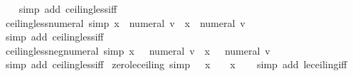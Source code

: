 \begin{isabellebody}
%
\isadelimproof
\ \ %
\endisadelimproof
%
\isatagproof
{}\isamarkupfalse%
\ {\isacharparenleft}{\kern0pt}simp\ add{\isacharcolon}{\kern0pt}\ ceiling{\isacharunderscore}{\kern0pt}less{\isacharunderscore}{\kern0pt}iff{\isacharparenright}{\kern0pt}%
\endisatagproof
{\isafoldproof}%
%
\isadelimproof
\isanewline
%
\endisadelimproof
\isanewline
{}\isamarkupfalse%
\ ceiling{\isacharunderscore}{\kern0pt}less{\isacharunderscore}{\kern0pt}numeral\ {\isacharbrackleft}{\kern0pt}simp{\isacharbrackright}{\kern0pt}{\isacharcolon}{\kern0pt}\ {\isachardoublequoteopen}{\isasymlceil}x{\isasymrceil}\ {\isacharless}{\kern0pt}\ numeral\ v\ {\isasymlongleftrightarrow}\ x\ {\isasymle}\ numeral\ v\ {\isacharminus}{\kern0pt}\ {}{\isachardoublequoteclose}\isanewline
%
\isadelimproof
\ \ %
\endisadelimproof
%
\isatagproof
{}\isamarkupfalse%
\ {\isacharparenleft}{\kern0pt}simp\ add{\isacharcolon}{\kern0pt}\ ceiling{\isacharunderscore}{\kern0pt}less{\isacharunderscore}{\kern0pt}iff{\isacharparenright}{\kern0pt}%
\endisatagproof
{\isafoldproof}%
%
\isadelimproof
\isanewline
%
\endisadelimproof
\isanewline
{}\isamarkupfalse%
\ ceiling{\isacharunderscore}{\kern0pt}less{\isacharunderscore}{\kern0pt}neg{\isacharunderscore}{\kern0pt}numeral\ {\isacharbrackleft}{\kern0pt}simp{\isacharbrackright}{\kern0pt}{\isacharcolon}{\kern0pt}\ {\isachardoublequoteopen}{\isasymlceil}x{\isasymrceil}\ {\isacharless}{\kern0pt}\ {\isacharminus}{\kern0pt}\ numeral\ v\ {\isasymlongleftrightarrow}\ x\ {\isasymle}\ {\isacharminus}{\kern0pt}\ numeral\ v\ {\isacharminus}{\kern0pt}\ {}{\isachardoublequoteclose}\isanewline
%
\isadelimproof
\ \ %
\endisadelimproof
%
\isatagproof
{}\isamarkupfalse%
\ {\isacharparenleft}{\kern0pt}simp\ add{\isacharcolon}{\kern0pt}\ ceiling{\isacharunderscore}{\kern0pt}less{\isacharunderscore}{\kern0pt}iff{\isacharparenright}{\kern0pt}%
\endisatagproof
{\isafoldproof}%
%
\isadelimproof
\isanewline
%
\endisadelimproof
\isanewline
{}\isamarkupfalse%
\ zero{\isacharunderscore}{\kern0pt}le{\isacharunderscore}{\kern0pt}ceiling\ {\isacharbrackleft}{\kern0pt}simp{\isacharbrackright}{\kern0pt}{\isacharcolon}{\kern0pt}\ {\isachardoublequoteopen}{}\ {\isasymle}\ {\isasymlceil}x{\isasymrceil}\ {\isasymlongleftrightarrow}\ {\isacharminus}{\kern0pt}{}\ {\isacharless}{\kern0pt}\ x{\isachardoublequoteclose}\isanewline
%
\isadelimproof
\ \ %
\endisadelimproof
%
\isatagproof
{}\isamarkupfalse%
\ {\isacharparenleft}{\kern0pt}simp\ add{\isacharcolon}{\kern0pt}\ le{\isacharunderscore}{\kern0pt}ceiling{\isacharunderscore}{\kern0pt}iff{\isacharparenright}{\kern0pt}%

\end{isabellebody}
